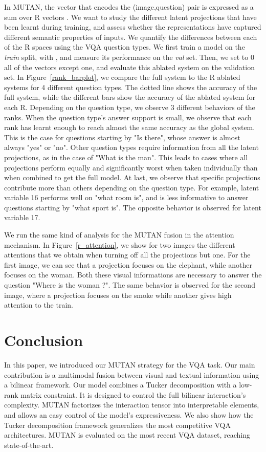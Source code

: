 \documentclass[10pt,twocolumn,letterpaper]{article}
\begin{document}
In MUTAN, the vector  that encodes the (image,question) pair is expressed as a sum over R vectors . We want to study the  different latent projections that have been learnt during training, and assess whether the representations have captured different semantic properties of inputs. We quantify the differences between each of the R spaces using the VQA question types. We first train a model on the \textit{train} split, with , and measure its performance on the \textit{val} set. Then, we set to 0 all of the  vectors except one, and evaluate this ablated system on the validation set. In Figure~\ref{rank_barplot}, we compare the full system to the R ablated systems for 4 different question types. The dotted line shows the accuracy of the full system, while the different bars show the accuracy of the ablated system for each R. Depending on the question type, we observe 3 different behaviors of the ranks. When the question type's answer support is small, we observe that each rank has learnt enough to reach almost the same accuracy as the global system. This is the case for questions starting by "Is there", whose answer is almost always "yes" or "no". Other question types require information from all the latent projections, as in the case of "What is the man". This leads to cases where all projections perform equally and significantly worst when taken individually than when combined to get the full model. At last, we observe that specific projections contribute more than others depending on the question type. For example, latent variable 16 performs well on "what room is", and is less informative to answer questions starting by "what sport is". The opposite behavior is observed for latent variable 17.

We run the same kind of analysis for the MUTAN fusion in the attention mechanism. In Figure~\ref{r_attention}, we show for two images the different attentions that we obtain when turning off all the projections but one. For the first image, we can see that a projection focuses on the elephant, while another focuses on the woman. Both these visual informations are necessary to answer the question "Where is the woman ?". The same behavior is observed for the second image, where a projection focuses on the smoke while another gives high attention to the train.
 \section{Conclusion}
In this paper, we introduced our MUTAN strategy for the VQA task. Our main contribution is a multimodal fusion between visual and textual information using a bilinear framework. Our model combines a Tucker decomposition with a low-rank matrix constraint. It is designed to control the full bilinear interaction's complexity. 
MUTAN factorizes the interaction tensor into interpretable elements, and allows an easy control of the model's expressiveness. We also show how the Tucker decomposition framework generalizes the most competitive VQA architectures. MUTAN is evaluated on the most recent VQA dataset, reaching state-of-the-art.
 
\end{document}
